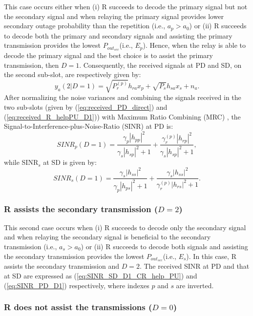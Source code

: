 \documentclass[conference,twocolumn]{IEEEtran}
\begin{document}
This case occurs either when (i) R succeeds to decode the primary signal but not the secondary signal and when relaying the primary signal provides lower secondary outage probability than the repetition (i.e., $a_p > a_0$) or (ii) R succeeds to decode both the primary and secondary signals and assisting the primary transmission provides the lowest $P_{out_{sec}}$(i.e., $E_p$). Hence, when the relay is able to decode the primary signal and the best choice is to assist the primary transmission, then $D=1$. Consequently, the received signals at PD and SD, on the second sub-slot, are respectively given by:
\begin{equation}
\label{eq:received_R_helpPU_D1}
y_{a}(2|D=1)=\sqrt{P_{r}^{(p)}}h_{ra}x_p+\sqrt{P_{s}}h_{sa}x_s+n_{a}.
\end{equation}
After normalizing the noise variances and combining the signals received in the two sub-slots (given by
(\ref{eq:received_PD_direct}) and (\ref{eq:received_R_helpPU_D1}))
with Maximum Ratio Combining (MRC) \cite{Yang_2009}, the
Signal-to-Interference-plus-Noise-Ratio (SINR) at PD is:
\begin{equation}
\label{eq:SINR_PD_D1}
SINR_{p}(D=1)=\frac{\gamma_{p}|h_{pp}|^2}{\gamma_{s}|h_{sp}|^2+1}+\frac{\gamma_{r}^{(p)}|h_{rp}|^2}{\gamma_{s}|h_{sp}|^2+1},
\end{equation}
while SINR$_{s}$ at SD is given by:
\begin{equation}
\label{eq:SINR_SD_D1_CR_help_PU}
SINR_{s}(D=1)=\frac{\gamma_{s}|h_{ss}|^2}{\gamma_{p}|h_{ps}|^2+1}+\frac{\gamma_{s}|h_{ss}|^2}{\gamma_{r}^{(p)}|h_{rs}|^2+1}.
\end{equation}

\subsubsection{R assists the secondary transmission ($D=2$)}

This second case occurs when (i) R succeeds to decode only the secondary signal and when relaying the secondary signal is beneficial to the secondary transmission (i.e., $a_s > a_0$) or (ii) R succeeds to decode both signals and assisting the secondary transmission provides the lowest $P_{out_{sec}}$(i.e., $E_s$). In this case, R assists the secondary transmission and $D=2$. The received SINR at PD and that at SD are expressed as (\ref{eq:SINR_SD_D1_CR_help_PU}) and (\ref{eq:SINR_PD_D1}) respectively, where indexes $p$ and $s$ are inverted.
\subsubsection{R does not assist the transmissions ($D=0$)}
\end{document}
